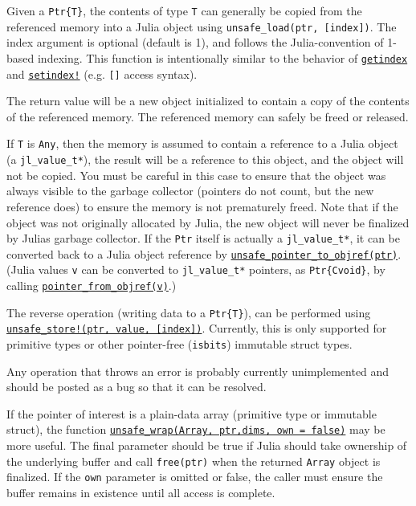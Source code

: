 Given a \texttt{Ptr\{T\}}, the contents of type \texttt{T} can generally be copied from the referenced memory into a Julia object using \texttt{unsafe\_load(ptr, [index])}. The index argument is optional (default is 1), and follows the Julia-convention of 1-based indexing. This function is intentionally similar to the behavior of \hyperlink{13720608614876840481}{\texttt{getindex}} and \hyperlink{1309244355901386657}{\texttt{setindex!}} (e.g. \texttt{[]} access syntax).



The return value will be a new object initialized to contain a copy of the contents of the referenced memory. The referenced memory can safely be freed or released.



If \texttt{T} is \texttt{Any}, then the memory is assumed to contain a reference to a Julia object (a \texttt{jl\_value\_t*}), the result will be a reference to this object, and the object will not be copied. You must be careful in this case to ensure that the object was always visible to the garbage collector (pointers do not count, but the new reference does) to ensure the memory is not prematurely freed. Note that if the object was not originally allocated by Julia, the new object will never be finalized by Julia{\textquotesingle}s garbage collector.  If the \texttt{Ptr} itself is actually a \texttt{jl\_value\_t*}, it can be converted back to a Julia object reference by \hyperlink{10812596548944930674}{\texttt{unsafe\_pointer\_to\_objref(ptr)}}. (Julia values \texttt{v} can be converted to \texttt{jl\_value\_t*} pointers, as \texttt{Ptr\{Cvoid\}}, by calling \hyperlink{9366554937543398846}{\texttt{pointer\_from\_objref(v)}}.)



The reverse operation (writing data to a \texttt{Ptr\{T\}}), can be performed using \hyperlink{4579672834750013041}{\texttt{unsafe\_store!(ptr, value, [index])}}. Currently, this is only supported for primitive types or other pointer-free (\texttt{isbits}) immutable struct types.



Any operation that throws an error is probably currently unimplemented and should be posted as a bug so that it can be resolved.



If the pointer of interest is a plain-data array (primitive type or immutable struct), the function \hyperlink{14566494858943689253}{\texttt{unsafe\_wrap(Array, ptr,dims, own = false)}} may be more useful. The final parameter should be true if Julia should {\textquotedbl}take ownership{\textquotedbl} of the underlying buffer and call \texttt{free(ptr)} when the returned \texttt{Array} object is finalized.  If the \texttt{own} parameter is omitted or false, the caller must ensure the buffer remains in existence until all access is complete.




